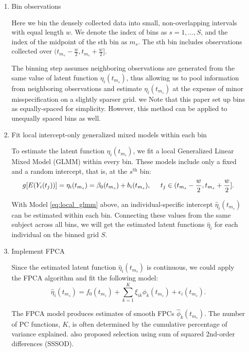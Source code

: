 \documentclass[12pt]{article}
\begin{document}
\begin{enumerate}
    \item Bin observations

Here we bin the densely collected data into small, non-overlapping intervals with equal length $w$. We denote the index of bins as $s = 1,...,S$, and the index of the midpoint of the sth bin as  $m_s$. The sth bin includes observations collected over $(t_{m_s}-\frac{w}{2}, t_{m_s}+\frac{w}{2}]$.

The binning step assumes neighboring observations are generated from the same value of latent function $\eta_i(t_{m_s})$, thus allowing us to pool information from neighboring observations and estimate $\eta_i(t_{m_s})$ at the expense of minor misspecification on a slightly sparser grid. we Note that this paper set up bins as equally-spaced for simplicity. However, this method can be applied to unequally spaced bins as well. 
    
    \item Fit local intercept-only generalized mixed models within each bin

To estimate the latent function $\eta_i(t_{m_s})$, we fit a local Generalized Linear Mixed Model (GLMM) within every bin. These models include only a fixed and a random intercept, that is, at the $s^{\text{th}}$ bin: 
\begin{equation}
    g[E(Y_i(t_j))] =\eta_i(t_{m_s})= \beta_0(t_{m_s})+b_i(t_{m_s}),
    \hspace{0.5cm}t_j \in (t_{m_s}-\frac{w}{2}, t_{m_s}+\frac{w}{2}].
    \label{eq:local_glmm}
\end{equation}

With Model \ref{eq:local_glmm} above, an individual-specific intercept $\hat{\eta}_i(t_{m_s})$ can be estimated within each bin. Connecting these values from the same subject across all bins, we will get the estimated latent functions  $\hat{\eta}_i$ for each individual on the binned grid $S$.
    
    \item Implement FPCA

Since the estimated latent function $\hat{\eta}_i(t_{m_s})$ is continuous, we could apply the FPCA algorithm and fit the following model: 
\begin{equation}
    \hat{\eta}_i(t_{m_s}) = f_0(t_{m_s})+\sum_{k=1}^K\xi_{ik}\phi_{k}(t_{m_s})+\epsilon_i(t_{m_s}).
    \label{eq:fpca}
\end{equation}

The FPCA model produces estimates of smooth FPCs $\hat{\phi}_k(t_{m_s})$. The
number of PC functions, $K$, is often determined by the cumulative percentage of variance explained. \citet{zhou2024} also proposed selection using sum of squared 2nd-order differences (SSSOD).


\end{enumerate}
\end{document}

